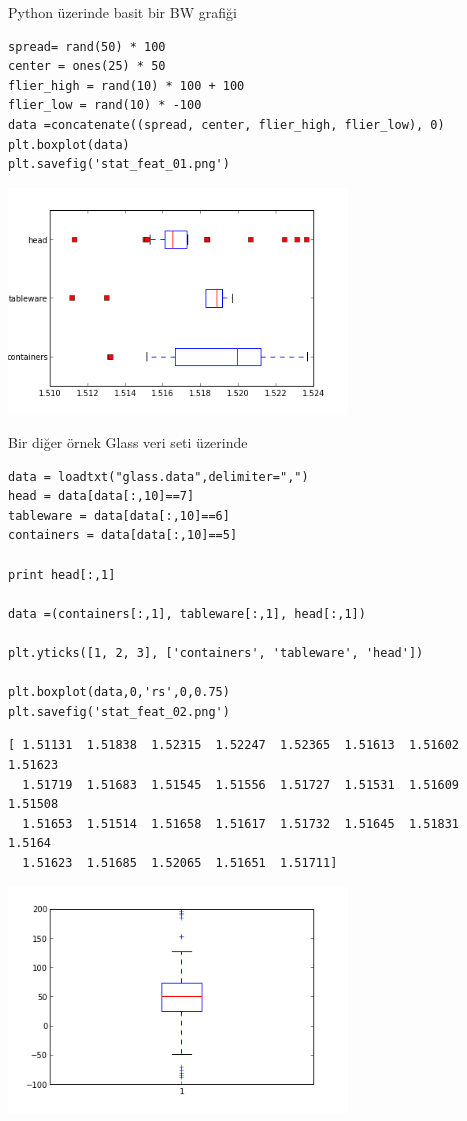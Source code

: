 \documentclass[12pt,fleqn]{article}\usepackage{../../common}
\begin{document}
Python üzerinde basit bir BW grafiği 

\begin{verbatim}
spread= rand(50) * 100
center = ones(25) * 50
flier_high = rand(10) * 100 + 100
flier_low = rand(10) * -100
data =concatenate((spread, center, flier_high, flier_low), 0)
plt.boxplot(data)
plt.savefig('stat_feat_01.png')
\end{verbatim}

\includegraphics[height=6cm]{stat_feat_01.png}

Bir diğer örnek Glass veri seti üzerinde

\begin{verbatim}
data = loadtxt("glass.data",delimiter=",")
head = data[data[:,10]==7]
tableware = data[data[:,10]==6]
containers = data[data[:,10]==5]

print head[:,1]

data =(containers[:,1], tableware[:,1], head[:,1])

plt.yticks([1, 2, 3], ['containers', 'tableware', 'head'])

plt.boxplot(data,0,'rs',0,0.75)
plt.savefig('stat_feat_02.png')
\end{verbatim}

\begin{verbatim}
[ 1.51131  1.51838  1.52315  1.52247  1.52365  1.51613  1.51602  1.51623
  1.51719  1.51683  1.51545  1.51556  1.51727  1.51531  1.51609  1.51508
  1.51653  1.51514  1.51658  1.51617  1.51732  1.51645  1.51831  1.5164
  1.51623  1.51685  1.52065  1.51651  1.51711]
\end{verbatim}

\includegraphics[height=6cm]{stat_feat_02.png}
\end{document}
